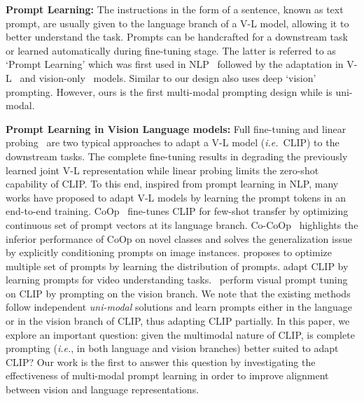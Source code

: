\documentclass[10pt,twocolumn,letterpaper]{article}
\def\ie{\emph{i.e.}\xspace}
\begin{document}
\noindent  \textbf{Prompt Learning:}
The instructions in the form of a sentence, known as text prompt, are usually given to the language branch of a V-L model, allowing it to better understand the task. Prompts can be handcrafted for a downstream task or learned automatically during fine-tuning stage. The latter is referred to as ‘Prompt Learning’ which was first used in NLP~\cite{li2021prefix,lester2021power,liu2021p} followed by the adaptation in V-L~\cite{zhou2022learning,zhou2022conditional, zhu2022prompt} and vision-only~\cite{jia2022visual,zhang2022neural,wang2022dualprompt,wang2022learning} models. Similar to \cite{jia2022visual} our
design also uses deep ‘vision’ prompting. However, ours
is the first multi-modal prompting design while \cite{jia2022visual} is uni-modal. 

\noindent  \textbf{Prompt Learning in Vision Language models:}
Full fine-tuning and linear probing~\cite{gao2021clip} are two typical approaches to adapt a V-L model (\ie~CLIP) to the downstream tasks. The complete fine-tuning results in degrading the previously learned joint V-L representation while linear probing limits the zero-shot capability of CLIP.
To this end, inspired from prompt learning in NLP, many works have proposed to adapt V-L models by learning the prompt tokens in an end-to-end training. CoOp~\cite{zhou2022learning} fine-tunes CLIP for few-shot transfer by optimizing continuous set of prompt vectors at its language branch. Co-CoOp~\cite{zhou2022conditional} highlights the inferior performance of CoOp on novel classes and solves the generalization issue by explicitly conditioning prompts on image instances.
\cite{lu2022prompt} proposes to optimize multiple set of prompts by learning the distribution of prompts. \cite{ju2021prompting} adapt CLIP by learning prompts for video understanding tasks.~\cite{bahng2022visual} perform visual prompt tuning on CLIP by prompting on the vision branch. We note that the existing methods follow independent \textit{uni-modal} solutions and learn prompts either in the language or in the vision branch of CLIP, thus adapting CLIP partially. In this paper, we explore an important question: given the multimodal nature of CLIP, is complete prompting (\ie, in both language and vision branches) better suited to adapt CLIP? Our work is the first to answer this question by investigating the effectiveness of multi-modal prompt learning in order to improve alignment between vision and language representations. 
\end{document}
